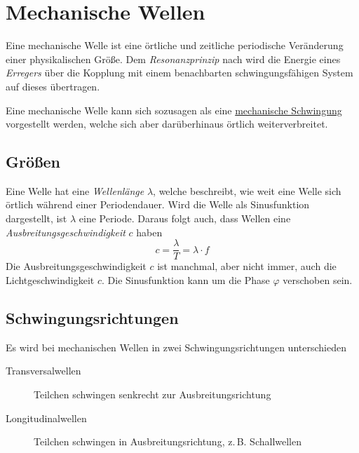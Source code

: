 \documentclass{article}
\begin{document}
\section{Mechanische Wellen} 
Eine mechanische Welle ist eine örtliche und zeitliche periodische Veränderung einer physikalischen Größe. Dem \emph{Resonanzprinzip} nach wird die Energie eines \emph{Erregers} über die Kopplung mit einem benachbarten schwingungsfähigen System auf dieses übertragen.
 
Eine mechanische Welle kann sich sozusagen als eine \hyperref[Mechanische Schwingungen]{mechanische Schwingung} vorgestellt werden, welche sich aber darüberhinaus örtlich weiterverbreitet.
 
\subsection{Größen} 
Eine Welle hat eine \emph{Wellenlänge} $\lambda$, welche beschreibt, wie weit eine Welle sich örtlich während einer Periodendauer. Wird die Welle als Sinusfunktion dargestellt, ist $\lambda$ eine Periode. Daraus folgt auch, dass Wellen eine \emph{Ausbreitungsgeschwindigkeit} $c$ haben
\[
 c = \frac{\lambda}{T} = \lambda \cdot f 
\]
Die Ausbreitungsgeschwindigkeit $c$ ist manchmal, aber nicht immer, auch die Lichtgeschwindigkeit $c$.
Die Sinusfunktion kann um die Phase $\varphi$ verschoben sein. 
 
\subsection{Schwingungsrichtungen} 
Es wird bei mechanischen Wellen in zwei Schwingungsrichtungen unterschieden
\begin{description}
 \item[Transversalwellen] Teilchen schwingen senkrecht zur Ausbreitungsrichtung
 \item[Longitudinalwellen] Teilchen schwingen in Ausbreitungsrichtung, z.\,B. Schallwellen
\end{description} 
\end{document}
